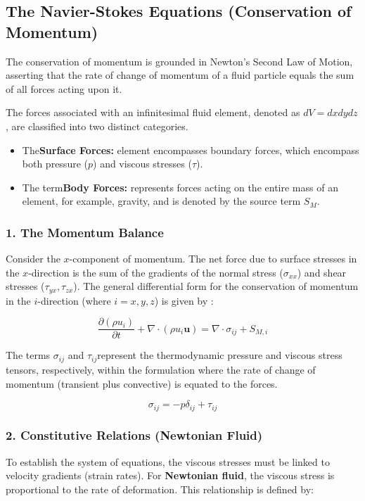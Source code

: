 \subsection{The Navier-Stokes Equations (Conservation of Momentum)}

The conservation of momentum is grounded in Newton's Second Law of Motion, asserting that the rate of change of momentum of a fluid particle equals the sum of all forces acting upon it.
\par
The forces associated with an infinitesimal fluid element, denoted as $dV = dx dy dz$, are classified into two distinct categories.
\begin{itemize}
    \item The\textbf{Surface Forces:} element encompasses boundary forces, which encompass both pressure ($p$) and viscous stresses ($\tau$).

    \item The term\textbf{Body Forces:} represents forces acting on the entire mass of an element, for example, gravity, and is denoted by the source term $S_M$.
\end{itemize}

\subsubsection*{1. The Momentum Balance}
Consider the $x$-component of momentum. The net force due to surface stresses in the $x$-direction is the sum of the gradients of the normal stress ($\sigma_{xx}$) and shear stresses ($\tau_{yx}, \tau_{zx}$). The general differential form for the conservation of momentum in the $i$-direction (where $i=x,y,z$) is given by \cite{versteeg2007cfd}:

\begin{equation}
    \frac{\partial (\rho u_i)}{\partial t} + \nabla \cdot (\rho u_i \mathbf{u}) = \nabla \cdot \sigma_{ij} + S_{M,i}
\end{equation}

The terms $\sigma_{ij}$ and $\tau_{ij}$represent the thermodynamic pressure and viscous stress tensors, respectively, within the formulation where the rate of change of momentum (transient plus convective) is equated to the forces.

\begin{equation}
    \sigma_{ij} = -p \delta_{ij} + \tau_{ij}
\end{equation}

\subsubsection*{2. Constitutive Relations (Newtonian Fluid)}
To establish the system of equations, the viscous stresses must be linked to velocity gradients (strain rates). For \textbf{Newtonian fluid}, the viscous stress is proportional to the rate of deformation. This relationship is defined by:

